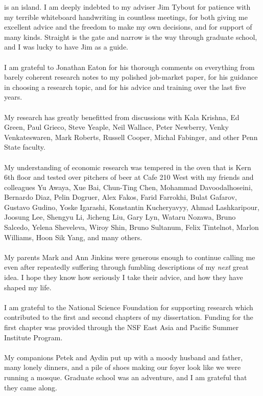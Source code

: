 
 is an island.  I am deeply indebted to my adviser Jim Tybout for patience with my terrible whiteboard handwriting in countless meetings, for both giving me excellent advice and the freedom to make my own decisions, and for support of many kinds.  Straight is the gate and narrow is the way through graduate school, and I was lucky to have Jim as a guide.\\
\vspace{1pt} \\
I am grateful to Jonathan Eaton for his thorough comments on everything from barely coherent research notes to my polished job-market paper, for his guidance in choosing a research topic, and for his advice and training over the last five years.\\
\vspace{1pt}\\
My research has greatly benefitted from discussions with Kala Krishna, Ed Green, Paul Grieco, Steve Yeaple, Neil Wallace, Peter Newberry, Venky Venkateswaren, Mark Roberts, Russell Cooper, Michal Fabinger, and other Penn State faculty.\\
\vspace{1pt}\\
My understanding of economic research was tempered in the oven that is Kern 6th floor and tested over pitchers of beer at Cafe 210 West with my friends and colleagues Yu Awaya, Xue Bai, Chun-Ting Chen, Mohammad Davoodalhoseini, Bernardo Diaz, Pelin Dogruer, Alex Fakos, Farid Farrokhi, Bulat Gafarov, Gustavo Gudino, Yoske Igarashi, Konstantin Kucheryavyy, Ahmad Lashkaripour, Joosung Lee, Shengyu Li, Jicheng Liu, Gary Lyn, Wataru Nozawa, Bruno Salcedo, Yelena Sheveleva, Wiroy Shin, Bruno Sultanum, Felix Tintelnot, Marlon Williams, Hoon Sik Yang, and many others.\\
\vspace{1pt}\\
My parents Mark and Ann Jinkins were generous enough to continue calling me even after repeatedly suffering through fumbling descriptions of my \emph{next} great idea.  I hope they know how seriously I take their advice, and how they have shaped my life.\\
\vspace{1pt}\\
I am grateful to the National Science Foundation for supporting research which contributed to the first and second chapters of my dissertation.  Funding for the first chapter was provided through the NSF East Asia and Pacific Summer Institute Program.\\
\vspace{1pt}\\
My companions Petek and Aydin put up with a moody husband and father, many lonely dinners, and a pile of shoes making our foyer look like we were running a mosque.  Graduate school was an adventure, and I am grateful that they came along.
